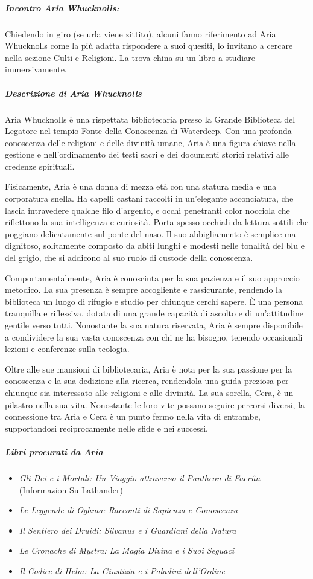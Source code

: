 \documentclass{article}
\begin{document}
    \subparagraph{Incontro Aria Whucknolls:} 
        Chiedendo in giro (se urla viene zittito), alcuni fanno riferimento ad Aria Whucknolls come la più adatta rispondere a suoi quesiti, lo invitano a cercare nella sezione Culti e Religioni. La trova china su un libro a studiare immersivamente. 

        \subparagraph{Descrizione di Aria Whucknolls}
        Aria Whucknolls è una rispettata bibliotecaria presso la Grande Biblioteca del Legatore nel tempio Fonte della Conoscenza di Waterdeep. Con una profonda conoscenza delle religioni e delle divinità umane, Aria è una figura chiave nella gestione e nell'ordinamento dei testi sacri e dei documenti storici relativi alle credenze spirituali.
        
        Fisicamente, Aria è una donna di mezza età con una statura media e una corporatura snella. Ha capelli castani raccolti in un'elegante acconciatura, che lascia intravedere qualche filo d'argento, e occhi penetranti color nocciola che riflettono la sua intelligenza e curiosità. Porta spesso occhiali da lettura sottili che poggiano delicatamente sul ponte del naso. Il suo abbigliamento è semplice ma dignitoso, solitamente composto da abiti lunghi e modesti nelle tonalità del blu e del grigio, che si addicono al suo ruolo di custode della conoscenza.
        
        Comportamentalmente, Aria è conosciuta per la sua pazienza e il suo approccio metodico. La sua presenza è sempre accogliente e rassicurante, rendendo la biblioteca un luogo di rifugio e studio per chiunque cerchi sapere. È una persona tranquilla e riflessiva, dotata di una grande capacità di ascolto e di un'attitudine gentile verso tutti. Nonostante la sua natura riservata, Aria è sempre disponibile a condividere la sua vasta conoscenza con chi ne ha bisogno, tenendo occasionali lezioni e conferenze sulla teologia.
        
        Oltre alle sue mansioni di bibliotecaria, Aria è nota per la sua passione per la conoscenza e la sua dedizione alla ricerca, rendendola una guida preziosa per chiunque sia interessato alle religioni e alle divinità. La sua sorella, Cera, è un pilastro nella sua vita. Nonostante le loro vite possano seguire percorsi diversi, la connessione tra Aria e Cera è un punto fermo nella vita di entrambe, supportandosi reciprocamente nelle sfide e nei successi.
    
    \subparagraph{Libri procurati da Aria} \begin{itemize}
        \item \textit{Gli Dei e i Mortali: Un Viaggio attraverso il Pantheon di Faerûn} (Informazion Su Lathander)
        \item \textit{Le Leggende di Oghma: Racconti di Sapienza e Conoscenza}
        \item \textit{Il Sentiero dei Druidi: Silvanus e i Guardiani della Natura}
        \item \textit{Le Cronache di Mystra: La Magia Divina e i Suoi Seguaci}
        \item \textit{Il Codice di Helm: La Giustizia e i Paladini dell'Ordine}
    \end{itemize}
\end{document}
